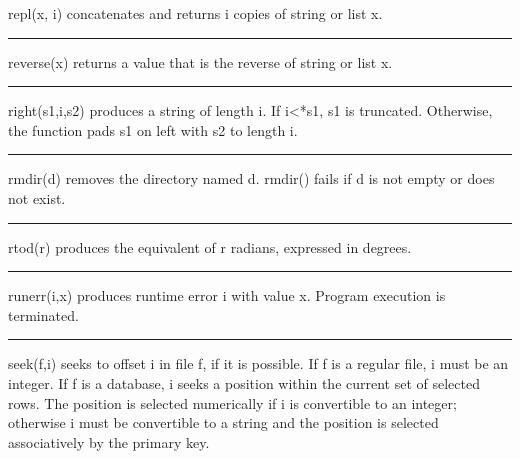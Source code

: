 \noindent
{}\textsf{repl(x, i)} concatenates and returns
\textsf{i} copies of string or list \textsf{x}.

\bigskip\hrule\vspace{0.1cm}

\noindent
{}\textsf{reverse(x)} returns a value that is the
reverse of string or list \textsf{x}.

\bigskip\hrule\vspace{0.1cm}

\noindent
{}\textsf{right(s1,i,s2)} produces a string of length
\textsf{i}. If \textsf{i{\textless}*s1}, \textsf{s1} is truncated.
Otherwise, the function pads \textsf{s1} on left with \textsf{s2} to
length \textsf{i}.

\bigskip\hrule\vspace{0.1cm}

\noindent
{}\textsf{rmdir(d)} removes the directory named
\textsf{d}. \textsf{rmdir()} fails if \textsf{d} is not empty or does
not exist.

\bigskip\hrule\vspace{0.1cm}

\noindent
{}\textsf{rtod(r)} produces the
equivalent of \textsf{r} radians, expressed in degrees.

\bigskip\hrule\vspace{0.1cm}

\noindent
{}\textsf{runerr(i,x)} produces runtime error
\textsf{i} with value \textsf{x}. Program execution is terminated.

\bigskip\hrule\vspace{0.1cm}

\noindent
{}\textsf{seek(f,i)} seeks to offset \textsf{i} in file
\textsf{f}, if it is possible. If \textsf{f} is a regular file,
\textsf{i} must be an integer. If \textsf{f} is a database, \textsf{i}
seeks a position within the current set of selected rows. The position
is selected numerically if \textsf{i} is convertible to an integer;
otherwise \textsf{i} must be convertible to a string and the position
is selected associatively by the primary key.

